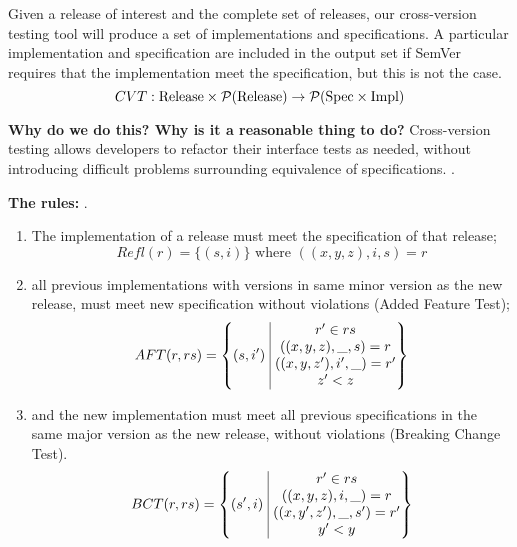 Given a release of interest and the complete set of releases, our
cross-version testing tool will produce a set of implementations and
specifications. A particular implementation and specification are
included in the output set if SemVer requires that the implementation
meet the specification, but this is not the case.
$$
CVT : \text{Release} \times \mathcal{P}(\text{Release}) \to \mathcal{P}(\text{Spec} \times \text{Impl})
$$

{\bf Why do we do this? Why is it a reasonable thing to do?}
Cross-version testing allows developers to refactor their interface
tests as needed, without introducing difficult problems surrounding
equivalence of specifications. .

{\bf The rules:} .

\begin{enumerate}
\item The implementation of a release must meet the specification of
  that release;
  $$ Refl(r) = \{(s, i)\} \text{ where } ((x,y,z), i, s) = r $$

    \item all previous implementations with versions in same minor version as the
    new release, must meet new specification without violations (Added Feature
    Test);
    $$AFT(r, rs) = \left\{ (s, i')\ \vline\ 
        \begin{matrix}
            r' \in rs \\
        ((x,y,z), \_, s) = r \\ 
        ((x,y,z'), i', \_) = r'\\
        z' < z \\
        \end{matrix}
    \right\}$$

    \item and the new implementation must meet all previous specifications in the same major version as the new
        release, without violations (Breaking Change Test).
    $$BCT(r, rs) = \left\{ (s', i)\ \vline\ 
        \begin{matrix}
            r' \in rs \\
        ((x, y, z), i, \_) = r \\ 
        ((x, y', z'), \_, s') = r'\\
        y' < y \\
        \end{matrix}
    \right\}$$
\end{enumerate}

